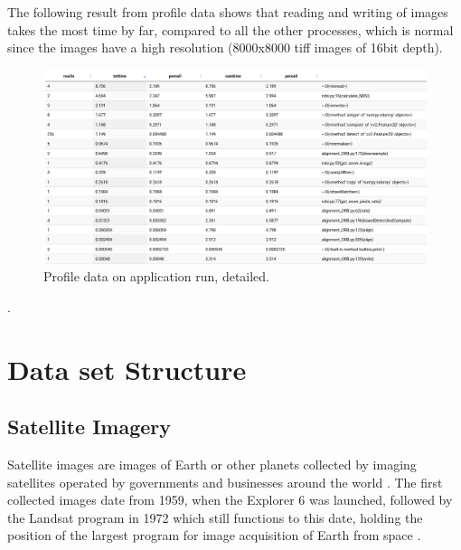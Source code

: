 \documentclass[12pt, a4paper]{report}
\begin{document}
	The following result from profile data shows that reading and writing of images takes the most time by far, compared to all the other processes, which is normal since the images have a high resolution (8000x8000 tiff images of 16bit depth). 

	\begin{figure}[h]
		\centering
		\includegraphics[scale=1]{profilebottom.png}
		\caption{Profile data on application run, detailed.}
		\label{fig:Profile bottom}
	\end{figure}
	.
	\newpage{}
	
	\chapter{Data set Structure}
	
	\section{Satellite Imagery}
	Satellite images are images of Earth or other planets collected by imaging satellites operated by governments and businesses around the world \cite{satellite_images}. The first collected images date from 1959, when the Explorer 6 was launched, followed by the Landsat program in 1972 which still functions to this date, holding the position of the largest program for image acquisition of Earth from space \cite{satellite_images}.
\end{document}
